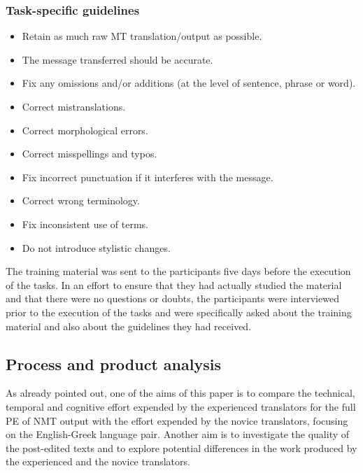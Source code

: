 \documentclass[output=paper]{langscibook}
\begin{document}
\subsubsection{Task-specific guidelines} \label{Task-specific guidelines}
\begin{itemize}[noitemsep]
    \item Retain as much raw MT translation/output as possible.
    \item The message transferred should be accurate.
    \item Fix any omissions and/or additions (at the level of sentence, phrase or word).
    \item Correct mistranslations.
    \item Correct morphological errors.
    \item Correct misspellings and typos.
    \item Fix incorrect punctuation if it interferes with the message.
    \item Correct wrong terminology.
    \item Fix inconsistent use of terms.
    \item Do not introduce stylistic changes.
\end{itemize}

The training material was sent to the participants five days before the execution of the tasks. Ιn an effort to ensure that they had actually studied the material and that there were no questions or doubts, the participants were interviewed prior to the execution of the tasks and were specifically asked about the training material and also about the guidelines they had received. 

\subsection{Process and product analysis}
As already pointed out, one of the aims of this paper is to compare the technical, temporal and cognitive effort \citep{krings2001repairing} expended by the experienced translators for the full PE of NMT output with the effort expended by the novice translators, focusing on the English-Greek language pair. Another aim is to investigate the quality of the post-edited texts and to explore potential differences in the work produced by the experienced and the novice translators.
\end{document}
